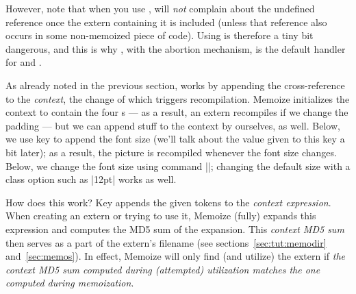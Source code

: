 \documentclass[a4paper,11pt]{article}
\begin{document}
However, note that when you use ,  will
\emph{not} complain about the undefined reference once the extern containing it
is included (unless that reference also occurs in some non-memoized piece of
code).  Using  is therefore a tiny bit dangerous, and
this is why , with the abortion mechanism, is the default
handler for  and .

As already noted in the previous section,  works by appending the
cross-reference to the \emph{context}, the change of which triggers
recompilation.  Memoize initializes the context to contain the four
s --- as a result, an extern recompiles if we change the
padding --- but we can append stuff to the context by ourselves, as well.
Below, we use key  to append the font size (we'll talk
about the value given to this key a bit later); as a result, the picture is
recompiled whenever the font size changes.  Below, we change the font size
using command |\small|; changing the default size with a class option such as
|12pt| works as well.



How does this work? Key  appends the given tokens to the
\emph{context expression}.  When creating an extern or trying to use it,
Memoize (fully) expands this expression and computes the MD5 sum of the
expansion.  This \emph{context MD5 sum} then serves as a part of the extern's
filename (see sections~\ref{sec:tut:memodir} and~\ref{sec:memos}).  In effect,
Memoize will only find (and utilize) the extern if \emph{the context MD5 sum
  computed during (attempted) utilization matches the one computed during
  memoization}.  
\end{document}
